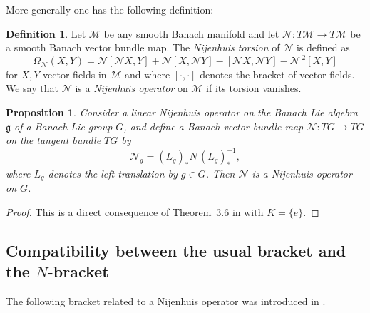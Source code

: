 \documentclass[a4paper,12pt,reqno]{amsart}%
\newtheorem{proposition}[theorem]{Proposition}
\theoremstyle{definition}
\newtheorem{definition}[theorem]{Definition}
\theoremstyle{remark}
\numberwithin{theorem}{section}
\numberwithin{equation}{section}
\newcommand{\1}{{\bf 1}}
\newcommand{\Nc}{\mathcal{N}}
\newcommand{\g}{{\mathfrak g}}
\begin{document}
More generally one has the following definition:
\begin{definition}\label{torJ} Let $\mathcal M$ be any smooth Banach manifold and let $\Nc:T\mathcal M\to T\mathcal M$ be a smooth Banach vector bundle map. The \emph{Nijenhuis torsion} of $\Nc$ is defined as 
\[
\Omega_{\Nc}(X,Y)=\Nc [\Nc X,Y]+\Nc [X,\Nc Y]-[\Nc X,\Nc Y]-\Nc^{\; 2}[X,Y]
\]
for $X,Y$ vector fields in $\mathcal M$ and where $[\cdot, \cdot]$ denotes the bracket of vector fields. We say that $\Nc$ is a \emph{Nijenhuis operator} on $\mathcal M$ if its torsion vanishes.
\end{definition}

\begin{proposition}
Consider a linear Nijenhuis operator on the Banach Lie algebra $\g$ of a Banach Lie group $G$, and define a Banach vector bundle map $\Nc: TG \rightarrow TG$ on the tangent bundle $TG$ by 
    \begin{equation}\label{Np}
\Nc_g = (L_g)_* N \, (L_g)_*^{-1},
\end{equation}
where $L_g$ denotes the left translation by $g\in G$. Then $\Nc$ is a Nijenhuis operator on $G$.
\end{proposition}

\begin{proof}
    This is a direct consequence of Theorem~3.6 in \cite{GLT-NN} with $K = \{e\}$. 
\end{proof}

\subsection{Compatibility between the usual bracket and the \texorpdfstring{$N$}{N}-bracket}
The following bracket related to a Nijenhuis operator was introduced in \cite{magri90}.
\end{document}
